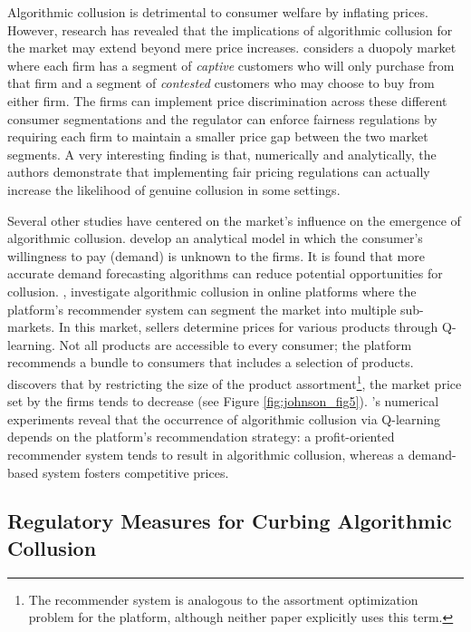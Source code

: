 \documentclass[mnsc,nonblindrev]{workingpaper}
\begin{document}
Algorithmic collusion is detrimental to consumer welfare by inflating prices. However, research has revealed that the implications of algorithmic collusion for the market may extend beyond mere price increases. \cite{yang2023regulating} considers a duopoly market where each firm has a segment of \textit{captive} customers who will only purchase from that firm and a segment of \textit{contested} customers who may choose to buy from either firm. The firms can implement price discrimination across these different consumer segmentations and the regulator can enforce fairness regulations by requiring each firm to maintain a smaller price gap between the two market segments. A very interesting finding is that, numerically and analytically, the authors demonstrate that implementing fair pricing regulations can actually increase the likelihood of genuine collusion in some settings. 

Several other studies have centered on the market’s influence on the emergence of algorithmic collusion. \cite{miklos2019collusion} develop an analytical model in which the consumer's willingness to pay (demand) is unknown to the firms. It is found that more accurate demand forecasting algorithms can reduce potential opportunities for collusion. \cite{johnson2023platform}, \cite{xu2023algorithmic} investigate algorithmic collusion in online platforms where the platform's recommender system can segment the market into multiple sub-markets. In this market, sellers determine prices for various products through Q-learning. Not all products are accessible to every consumer; the platform recommends a bundle to consumers that includes a selection of products. \cite{johnson2023platform} discovers that by restricting the size of the product assortment\footnote{The recommender system is analogous to the assortment optimization problem for the platform, although neither paper explicitly uses this term.}, the market price set by the firms tends to decrease (see Figure \ref{fig:johnson_fig5}). \cite{xu2023algorithmic}'s numerical experiments reveal that the occurrence of algorithmic collusion via Q-learning depends on the platform's recommendation strategy: a profit-oriented recommender system tends to result in algorithmic collusion, whereas a demand-based system fosters competitive prices.

\subsection{Regulatory Measures for Curbing Algorithmic Collusion}
\label{subsec:curb}
\end{document}
